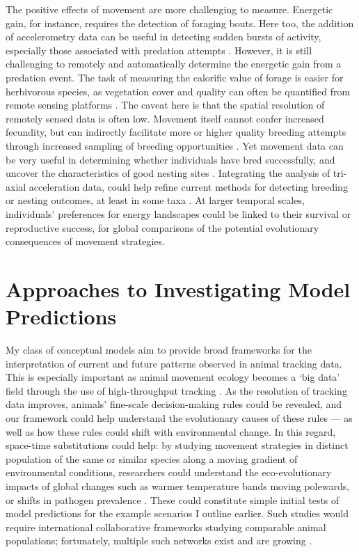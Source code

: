 The positive effects of movement are more challenging to measure.
Energetic gain, for instance, requires the detection of foraging bouts.
Here too, the addition of accelerometry data can be useful in detecting sudden bursts of activity, especially those associated with predation attempts \parencite{williams2014,bryce2017}.
However, it is still challenging to remotely and automatically determine the energetic gain from a predation event.
The task of measuring the calorific value of forage is easier for herbivorous species, as vegetation cover and quality can often be quantified from remote sensing platforms \parencite{pettorelli2011}.
The caveat here is that the spatial resolution of remotely sensed data is often low.
Movement itself cannot confer increased fecundity, but can indirectly facilitate more or higher quality breeding attempts through increased sampling of breeding opportunities \parencite[as in][]{kempenaers2017}.
Yet movement data can be very useful in determining whether individuals have bred successfully, and uncover the characteristics of good nesting sites \parencite{picardi2020}.
Integrating the analysis of tri-axial acceleration data, could help refine current methods for detecting breeding or nesting outcomes, at least in some taxa \parencite{schreven2021}.
At larger temporal scales, individuals' preferences for energy landscapes could be linked to their survival or reproductive success, for global comparisons of the potential evolutionary consequences of movement strategies.

\section*{Approaches to Investigating Model Predictions}

My class of conceptual models aim to provide broad frameworks for the interpretation of current and future patterns observed in animal tracking data.
This is especially important as animal movement ecology becomes a `big data' field through the use of high-throughput tracking \parencite{nathan2022}.
As the resolution of tracking data improves, animals' fine-scale decision-making rules could be revealed, and our framework could help understand the evolutionary causes of these rules --- as well as how these rules could shift with environmental change.
In this regard, space-time substitutions could help: by studying movement strategies in distinct population of the same or similar species along a moving gradient of environmental conditions, researchers could understand the eco-evolutionary impacts of global changes such as warmer temperature bands moving polewards, or shifts in pathogen prevalence \parencite{blois2013,carlson2022a}.
These could constitute simple initial tests of model predictions for the example scenarios I outline earlier.
Such studies would require international collaborative frameworks studying comparable animal populations; fortunately, multiple such networks exist and are growing \parencite{iverson2019,davidson2020,jetz2022}.

{ \begin{center}  \end{center} }
